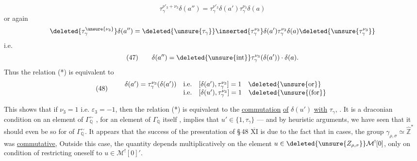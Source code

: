 

\[
\tau_\gamma^{\nu'_3+\nu_3}\delta(a'')
 =\tau_\gamma^{\nu'_3}\delta(a')\tau_\gamma^{\nu_3}\delta(a)
\]
or again
\[
\deleted{\tau_\gamma^{\unsure{\nu_3}}}\delta(a'')
 =\deleted{\unsure{\tau_\gamma}}\inserted{\tau_\gamma^{\nu_3}}
 \delta(a')\tau_\gamma^{\nu_3}\delta(a)
 \deleted{\unsure{\tau_\gamma^{\nu_3}}}
\]
i.e.
\[
(47)\qquad
\delta(a'')=\deleted{\unsure{\operatorname{int}}}
 \tau_\gamma^{\nu_3}(\delta(a'))\cdot\delta(a).
\]
Thus the relation (*) is equivalent to
\[
(48)\qquad
\begin{array}{lll}
\delta(a')=\tau_\gamma^{\nu_3}(\delta(a'))
 &\text{i.e.}&[\delta(a'),\tau_\gamma^{\nu_3}]=1\quad
 \deleted{\unsure{\text{or}}}\\
 &\text{i.e.}&[\delta(u'),\tau_\gamma^{\nu_3}]=1\quad
 \deleted{\unsure{\text{(for}}}
\end{array}
\]

This shows that if \(\nu_3=1\) i.e. \(\varepsilon_3=-1\), then
the relation (*) is equivalent to the \uline{commutation}
\uline{of} \(\delta(u')\) 
\uline{with} \(\tau_\gamma\),
.
It is a draconian condition on an element of \(\Gamma_{\mathbb Q}^{\sim}\)
, for an element of \(\Gamma_{\mathbb Q}\)
itself , implies that
\(u'\in\{1,\tau_\gamma\}\) --- and by heuristic arguments, we have seen
that it should even be so for 
of \(\Gamma_{\mathbb Q}^{\sim}\). It appears that the success of the presentation
of \S\,48 \uline{\(\overline{\mathrm{XI}}\)} is due to the fact that
 
 in  cases,
the group \(\gamma_{\rho,\sigma}\simeq\widehat{\mathbb Z}^{*}\)
was \uline{commutative}, 
Outside this case, the quantity
depends multiplicatively on the element
\(u\in\deleted{\unsure{Z_{\rho,\sigma}}}\mathcal M^{!}[0]\),
only on condition of restricting oneself to \(u\in\mathcal M^{!}[0]'\).

